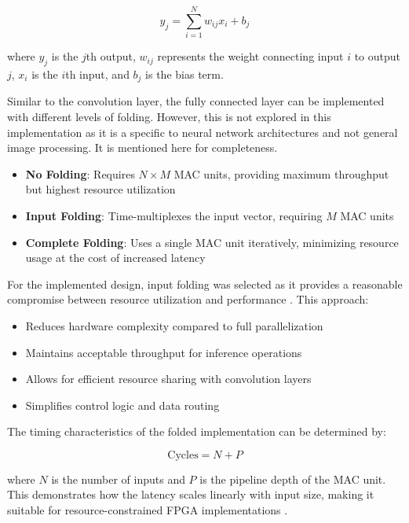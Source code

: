 \begin{equation}
    y_j = \sum_{i=1}^{N} w_{ij}x_i + b_j
\end{equation}

where $y_j$ is the $j$th output, $w_{ij}$ represents the weight connecting input $i$ to output $j$, $x_i$ is the $i$th input, and $b_j$ is the bias term.

Similar to the convolution layer, the fully connected layer can be implemented with different levels of folding. However, this is not explored in this implementation as it is a specific to neural network architectures and not general image processing.
It is mentioned here for completeness.

\begin{itemize}
    \item \textbf{No Folding}: Requires $N \times M$ MAC units, providing maximum throughput but highest resource utilization
    \item \textbf{Input Folding}: Time-multiplexes the input vector, requiring $M$ MAC units
    \item \textbf{Complete Folding}: Uses a single MAC unit iteratively, minimizing resource usage at the cost of increased latency
\end{itemize}

For the implemented design, input folding was selected as it provides a reasonable compromise between resource utilization and performance \cite{16}. This approach:
\begin{itemize}
    \item Reduces hardware complexity compared to full parallelization
    \item Maintains acceptable throughput for inference operations
    \item Allows for efficient resource sharing with convolution layers
    \item Simplifies control logic and data routing
\end{itemize}

The timing characteristics of the folded implementation can be determined by:

\begin{equation}
    \text{Cycles} = N + P
\end{equation}

where $N$ is the number of inputs and $P$ is the pipeline depth of the MAC unit. This demonstrates how the latency scales linearly with input size, making it suitable for resource-constrained FPGA implementations \cite{17}.

